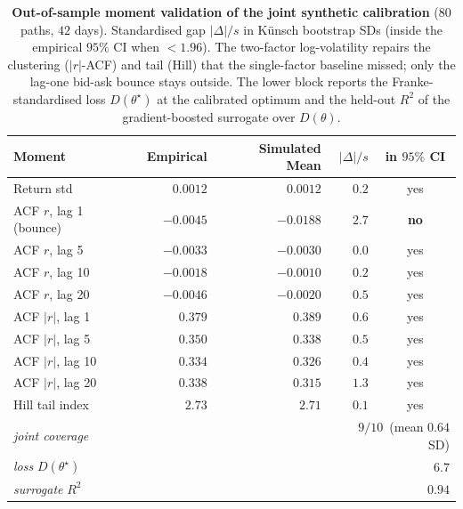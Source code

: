 \begin{table}[H]
\centering\small
\caption{\textbf{Out-of-sample moment validation of the joint synthetic calibration} ($80$ paths,
$42$ days). Standardised gap $|\Delta|/s$ in K\"unsch bootstrap SDs (inside the empirical $95\%$ CI
when ${<}1.96$). The two-factor log-volatility repairs the clustering ($|r|$-ACF) and tail (Hill)
that the single-factor baseline missed; only the lag-one bid-ask bounce stays outside. The lower block
reports the Franke-standardised loss $D(\theta^\star)$ at the calibrated optimum and the held-out
$R^2$ of the gradient-boosted surrogate over $D(\theta)$.}
\label{tab:cal-synth}
\begin{tabular}{l r r r c}
\toprule
Moment & Empirical & Simulated Mean & $|\Delta|/s$ & in $95\%$ CI \\
\midrule
Return std                  & $0.0012$  & $0.0012$  & $0.2$ & yes \\
ACF $r$, lag 1 (bounce)     & $-0.0045$ & $-0.0188$ & $2.7$ & \textbf{no} \\
ACF $r$, lag 5              & $-0.0033$ & $-0.0030$ & $0.0$ & yes \\
ACF $r$, lag 10             & $-0.0018$ & $-0.0010$ & $0.2$ & yes \\
ACF $r$, lag 20             & $-0.0046$ & $-0.0020$ & $0.5$ & yes \\
ACF $|r|$, lag 1            & $0.379$   & $0.389$   & $0.6$ & yes \\
ACF $|r|$, lag 5            & $0.350$   & $0.338$   & $0.5$ & yes \\
ACF $|r|$, lag 10           & $0.334$   & $0.326$   & $0.4$ & yes \\
ACF $|r|$, lag 20           & $0.338$   & $0.315$   & $1.3$ & yes \\
Hill tail index             & $2.73$    & $2.71$    & $0.1$ & yes \\
\midrule
\multicolumn{3}{l}{\emph{joint coverage}} & \multicolumn{2}{r}{$9/10$\, (mean $0.64$ SD)} \\
\multicolumn{3}{l}{\emph{loss} $D(\theta^\star)$} & \multicolumn{2}{r}{$6.7$} \\
\multicolumn{3}{l}{\emph{surrogate} $R^2$} & \multicolumn{2}{r}{$0.94$} \\
\bottomrule
\end{tabular}
\end{table}

